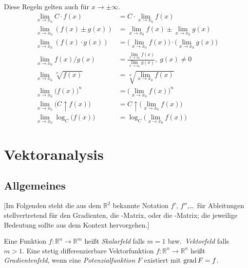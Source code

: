 Diese Regeln gelten auch für $x\to\pm\infty$.
\begin{align*}
	\lim_{x\to x_0}C\cdot f(x)                 & = C \cdot \lim_{x\to x_0}f(x)                                           \\
	\lim_{x\to x_0}(f(x)\pm g(x))              & = \lim_{x\to x_0}f(x) \pm \lim_{x\to x_0}g(x)                           \\
	\lim_{x\to x_0}(f(x)\cdot g(x))            & = \bigl(\lim_{x\to x_0}f(x)\bigr) \cdot \bigl(\lim_{x\to x_0}g(x)\bigr) \\
	\lim_{x\to x_0} f(x)/g(x)                  & = \frac{\lim_{x\to x_0} f(x)}{\lim_{x\to x_0}g(x)},\; g(x)\neq0         \\
	\lim_{x\to x_0}\sqrt[n]{f(x)}              & = \sqrt[n]{\lim_{x\to x_0}f(x)}                                         \\
	\lim_{x\to x_0}\bigl(f(x)\bigr)^n          & = \bigl(\lim_{x\to x_0}f(x)\bigr)^n                                     \\
	\lim_{x\to x_0}\bigl(C \uparrow f(x)\bigr) & = C \uparrow \bigl(\lim_{x\to x_0} f(x)\bigr)                           \\
	\lim_{x\to x_0}\log_C\bigl(f(x)\bigr)      & = \log_C \bigl( \lim_{x\to x_0} f(x)\bigr)
\end{align*}


\chapter{Vektoranalysis}

\section{Allgemeines}

[Im Folgenden steht die aus dem $\mathbb{R}^2$ bekannte Notation $f'$, $f''$,\ldots~für Ableitungen stellvertretend für den Gradienten, die -Matrix, oder die -Matrix; die jeweilige Bedeutung sollte aus dem Kontext hervorgehen.]

Eine Funktion $f:\mathbb{R}^n \to \mathbb{R}^m$ heißt \emph{Skalarfeld} falls $m=1$ bzw.~\emph{Vektorfeld} falls $m>1$.
Eine stetig differenzierbare Vektorfunktion $ f : \mathbb{R}^n \to \mathbb{R}^n $ heißt \emph{Gradientenfeld}, wenn eine \emph{Potenzialfunktion} $F$ existiert mit $\operatorname{grad} F = f$.

